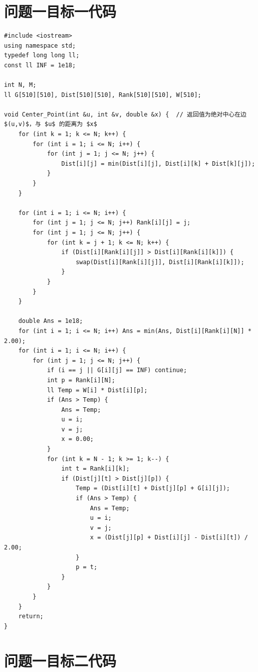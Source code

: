 \documentclass{cumcmthesis}
\begin{document}
\begin{appendices}


\section{问题一目标一代码}

\begin{lstlisting}
#include <iostream>
using namespace std;
typedef long long ll;
const ll INF = 1e18;

int N, M;
ll G[510][510], Dist[510][510], Rank[510][510], W[510];

void Center_Point(int &u, int &v, double &x) {  // 返回值为绝对中心在边 $(u,v)$，与 $u$ 的距离为 $x$
    for (int k = 1; k <= N; k++) {
        for (int i = 1; i <= N; i++) {
            for (int j = 1; j <= N; j++) {
                Dist[i][j] = min(Dist[i][j], Dist[i][k] + Dist[k][j]);
            }
        }
    }

    for (int i = 1; i <= N; i++) {
        for (int j = 1; j <= N; j++) Rank[i][j] = j;
        for (int j = 1; j <= N; j++) {
            for (int k = j + 1; k <= N; k++) {
                if (Dist[i][Rank[i][j]] > Dist[i][Rank[i][k]]) {
                    swap(Dist[i][Rank[i][j]], Dist[i][Rank[i][k]]);
                }
            }
        }
    }

    double Ans = 1e18;
    for (int i = 1; i <= N; i++) Ans = min(Ans, Dist[i][Rank[i][N]] * 2.00);
    for (int i = 1; i <= N; i++) {
        for (int j = 1; j <= N; j++) {
            if (i == j || G[i][j] == INF) continue;
            int p = Rank[i][N];
            ll Temp = W[i] * Dist[i][p];
            if (Ans > Temp) {
                Ans = Temp;
                u = i;
                v = j;
                x = 0.00;
            }
            for (int k = N - 1; k >= 1; k--) {
                int t = Rank[i][k];
                if (Dist[j][t] > Dist[j][p]) {
                    Temp = (Dist[i][t] + Dist[j][p] + G[i][j]);
                    if (Ans > Temp) {
                        Ans = Temp;
                        u = i;
                        v = j;
                        x = (Dist[j][p] + Dist[i][j] - Dist[i][t]) / 2.00;
                    }
                    p = t;
                }
            }
        }
    }
    return;
}
\end{lstlisting}

\section{问题一目标二代码}


\end{appendices}
\end{document}
